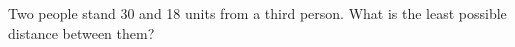 Two people stand 30 and 18 units from a third person. What is the least possible distance between them?

